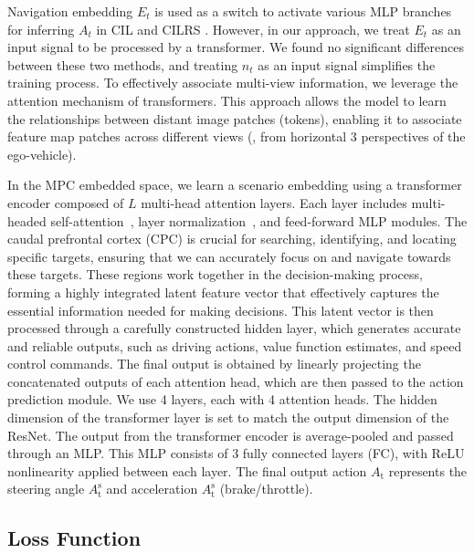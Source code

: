 Navigation embedding $E_{t}$ is used as a switch to activate various MLP branches for inferring $A_{t}$ in CIL \cite{Codevilla:2018} and CILRS \cite{Codevilla:2019}. 
However, in our approach, we treat $E_{t}$ as an input signal to be processed by a transformer. 
We found no significant differences between these two methods, and treating $n_{t}$ as an input signal simplifies the training process.
%
To effectively associate multi-view information, we leverage the attention mechanism of transformers\cite{Vaswani:2017}. 
This approach allows the model to learn the relationships between distant image patches (tokens), enabling it to associate feature map patches across different views ({\ie}, from horizontal 3 perspectives of the ego-vehicle). 


In the MPC embedded space, we learn a scenario embedding using a transformer encoder composed of $L$ multi-head attention layers. 
Each layer includes multi-headed self-attention~\cite{Vaswani:2017}, layer normalization~\cite{Ba:2016}, and feed-forward MLP modules. 
The caudal prefrontal cortex (CPC) is crucial for searching, identifying, and locating specific targets, ensuring that we can accurately focus on and navigate towards these targets. 
These regions work together in the decision-making process, forming a highly integrated latent feature vector that effectively captures the essential information needed for making decisions. 
This latent vector is then processed through a carefully constructed hidden layer, which generates accurate and reliable outputs, such as driving actions, value function estimates, and speed control commands.
The final output is obtained by linearly projecting the concatenated outputs of each attention head, which are then passed to the action prediction module.
We use 4 layers, each with 4 attention heads. 
The hidden dimension of the transformer layer is set to match the output dimension of the ResNet. 
%
The output from the transformer encoder is average-pooled and passed through an MLP.
This MLP consists of 3 fully connected layers (FC), with ReLU nonlinearity applied between each layer.
The final output action $A_\text{t}$ represents the steering angle $A_\text{t}^\text{s}$ and acceleration $A_\text{t}^\text{s}$ (brake/throttle). 





\subsection{Loss Function}

